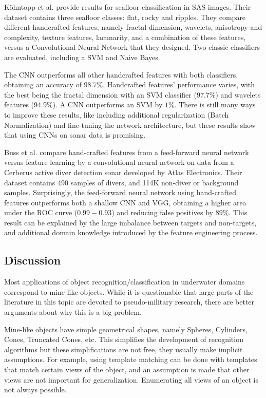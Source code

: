 K\"ohntopp et al. \cite{kohntopp2017seafloor} provide results for seafloor classification in SAS images. Their dataset contains three seafloor classes: flat, rocky and ripples. They compare different handcrafted features, namely fractal dimension, wavelets, anisotropy and complexity, texture features, lacunarity, and a combination of these features, versus a Convolutional Neural Network that they designed. Two classic classifiers are evaluated, including a SVM and Naive Bayes.

The CNN outperforms all other handcrafted features with both classifiers, obtaining an accuracy of $98.7 \%$. Handcrafted features' performance varies, with the best being the fractal dimension with an SVM classifier ($97.7 \%$) and wavelets features ($94.9 \%$). A CNN outperforms an SVM by $1 \%$.
There is still many ways to improve these results, like including additional regularization (Batch Normalization) and fine-tuning the network architecture, but these results show that using CNNs on sonar data is promising.

Buss et al. \cite{buss2018hand} compare hand-crafted features from a feed-forward neural network versus feature learning by a convolutional neural network on data from a Cerberus active diver detection sonar developed by Atlas Electronics. Their dataset contains 490 samples of divers, and 114K non-diver or background samples. Surprisingly, the feed-forward neural network using hand-crafted features outperforms both a shallow CNN and VGG, obtaining a higher area under the ROC curve ($0.99 - 0.93$) and reducing false positives by $89 \%$. This result can be explained by the large imbalance between targets and non-targets, and additional domain knowledge introduced by the feature engineering process.

\subsection{Discussion}

Most applications of object recognition/classification in underwater domains correspond to mine-like objects. While it is questionable that large parts of the literature in this topic are devoted to pseudo-military research, there are better arguments about why this is a big problem.

Mine-like objects have simple geometrical shapes, namely Spheres, Cylinders, Cones, Truncated Cones, etc. This simplifies the development of recognition algorithms but these simplifications are not free, they usually make implicit assumptions. For example, using template matching can be done with templates that match certain views of the object, and an assumption is made that other views are not important for generalization. Enumerating all views of an object is not always possible.

